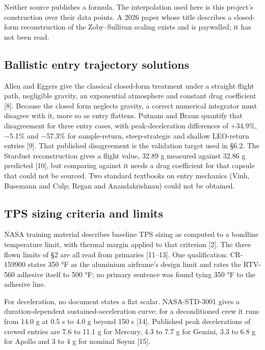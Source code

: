 \documentclass[
  a4paper,
  11pt]{article}
\begin{document}
Neither source publishes a formula. The interpolation used here is this
project's construction over their data points. A 2026 paper whose title
describes a closed-form reconstruction of the Zoby--Sullivan scaling
exists and is paywalled; it has not been read.

\subsection{Ballistic entry trajectory solutions}

Allen and Eggers give the classical closed-form treatment under a
straight flight path, negligible gravity, an exponential atmosphere and
constant drag coefficient {[}8{]}. Because the closed form neglects
gravity, a correct numerical integrator must disagree with it, more so
as entry flattens. Putnam and Braun quantify that disagreement for three
entry cases, with peak-deceleration differences of +34.9\%, −5.1\% and
−57.3\% for sample-return, steep-strategic and shallow LEO-return
entries {[}9{]}. That published disagreement is the validation target
used in §6.2. The Stardust reconstruction gives a flight value, 32.89 g
measured against 32.86 g predicted {[}10{]}, but comparing against it
needs a drag coefficient for that capsule that could not be sourced. Two
standard textbooks on entry mechanics (Vinh, Busemann and Culp; Regan
and Anandakrishnan) could not be obtained.

\subsection{TPS sizing criteria and limits}

NASA training material describes baseline TPS sizing as computed to a
bondline temperature limit, with thermal margin applied to that
criterion {[}2{]}. The three flown limits of §2 are all read from
primaries {[}11--13{]}. One qualification: CR-159900 states 350 °F as
the aluminium airframe's design limit and rates the RTV-560 adhesive
itself to 500 °F; no primary sentence was found tying 350 °F to the
adhesive line.

For deceleration, no document states a flat scalar. NASA-STD-3001 gives
a duration-dependent sustained-acceleration curve; for a deconditioned
crew it runs from 14.0 g at 0.5 s to 4.0 g beyond 150 s {[}14{]}.
Published peak decelerations of crewed entries are 7.6 to 11.1 g for
Mercury, 4.3 to 7.7 g for Gemini, 3.3 to 6.8 g for Apollo and 3 to 4 g
for nominal Soyuz {[}15{]}.
\end{document}
